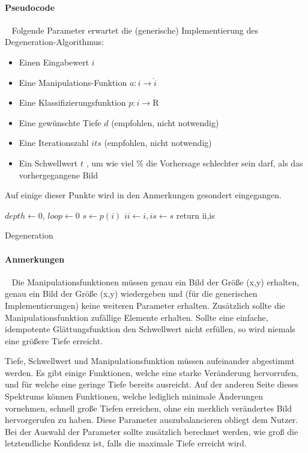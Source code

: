 \paragraph{Pseudocode} ~\newline 
Folgende Parameter erwartet die (generische) Implementierung des Degeneration-Algorithmus: 
\begin{itemize}
	\item Einen Eingabewert $i$
	\item Eine Manipulations-Funktion $a : i \rightarrow \hat{i}$
	\item Eine Klassifizierungsfunktion $p : i \rightarrow \mathrm{R}$
	\item Eine gewünschte Tiefe $d$ (empfohlen, nicht notwendig)
	\item Eine Iterationszahl $its$ (empfohlen, nicht notwendig)
	\item Ein Schwellwert $t$ , um wie viel \% die Vorhersage schlechter sein darf, als das vorhergegangene Bild 
\end{itemize}
Auf einige dieser Punkte wird in den Anmerkungen gesondert eingegangen. ~\newline
\IncMargin{1em}
\begin{algorithm}
	\BlankLine
	$depth  \leftarrow 0$, $loop \leftarrow0$ \;
	$s \leftarrow p(i)$\;
	$ii \leftarrow i , is \leftarrow s$ \;
	return ii,is\;
	
	\caption{Degeneration}\label{algo_degen}
\end{algorithm}\DecMargin{1em}
\newpage
\paragraph{Anmerkungen}~\newline 
Die Manipulationsfunktionen müssen genau ein Bild der Größe (x,y) erhalten, genau ein Bild der Größe (x,y) wiedergeben und (für die generischen Implementierungen) keine weiteren Parameter erhalten. 
Zusätzlich sollte die Manipulationsfunktion zufällige Elemente erhalten. 
Sollte eine einfache, idempotente Glättungsfunktion den Schwellwert nicht erfüllen, so wird niemals eine größere Tiefe erreicht.

Tiefe, Schwellwert und Manipulationsfunktion müssen aufeinander abgestimmt werden. 
Es gibt einige Funktionen, welche eine starke Veränderung hervorrufen, und für welche eine geringe Tiefe bereits ausreicht.
Auf der anderen Seite dieses Spektrums können Funktionen, welche lediglich minimale Änderungen vornehmen, schnell große Tiefen erreichen, ohne ein merklich verändertes Bild hervorgerufen zu haben. Diese Parameter auszubalancieren obliegt dem Nutzer. 
Bei der Auswahl der Parameter sollte zusätzlich berechnet werden, wie groß die letztendliche Konfidenz ist, falls die maximale Tiefe erreicht wird. 

